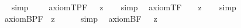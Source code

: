 \begin{isabellebody}
\isadelimproof
\ %
\endisadelimproof
%
\isatagproof
{}\isamarkupfalse%
\ simp%
\endisatagproof
{\isafoldproof}%
%
\isadelimproof
%
\endisadelimproof
\ \isamarkupfalse%
%
\isadelimproof
\ %
\endisadelimproof
%
\isatagproof
{}\isamarkupfalse%
%
\endisatagproof
{\isafoldproof}%
%
\isadelimproof
%
\endisadelimproof
%
\isamarkuptrue%
\isamarkupfalse%
\ axiom{\isacharunderscore}T{\isacharunderscore}PF{\isacharcolon}\ {\isachardoublequoteopen}{\isacharbrackleft}{\isacharparenleft}{\isasymbox}\ {\isacharcomma}{\isasymphi}{\isacharcomma}{\isacharparenright}\ {\isasymrightarrow}\isactrlsup z\ {\isacharcomma}{\isasymphi}{\isacharcomma}{\isacharbrackright}{\isachardoublequoteclose}%
\isadelimproof
\ %
\endisadelimproof
%
\isatagproof
{}\isamarkupfalse%
\ simp\ \isamarkupfalse%
%
\endisatagproof
{\isafoldproof}%
%
\isadelimproof
%
\endisadelimproof
\isanewline
{}\isamarkupfalse%
\ axiom{\isacharunderscore}T{\isacharunderscore}F{\isacharcolon}\ \ {\isachardoublequoteopen}{\isacharbrackleft}{\isacharparenleft}{\isasymbox}\ {\isacharsemicolon}{\isasymphi}{\isacharsemicolon}{\isacharparenright}\ {\isasymrightarrow}\isactrlsup z\ {\isacharsemicolon}{\isasymphi}{\isacharsemicolon}{\isacharbrackright}{\isachardoublequoteclose}%
\isadelimproof
\ %
\endisadelimproof
%
\isatagproof
{}\isamarkupfalse%
\ simp\ \isamarkupfalse%
%
\endisatagproof
{\isafoldproof}%
%
\isadelimproof
%
\endisadelimproof
\isanewline
\isanewline
{}\isamarkupfalse%
\ axiom{\isacharunderscore}B{\isacharunderscore}PF{\isacharcolon}\ {\isachardoublequoteopen}{\isacharbrackleft}{\isacharcomma}{\isasymphi}{\isacharcomma}\ {\isasymrightarrow}\isactrlsup z\ {\isacharparenleft}{\isasymbox}\ {\isacharparenleft}{\isasymdiamond}\ {\isacharcomma}{\isasymphi}{\isacharcomma}{\isacharparenright}{\isacharparenright}{\isacharbrackright}{\isachardoublequoteclose}%
\isadelimproof
\ %
\endisadelimproof
%
\isatagproof
{}\isamarkupfalse%
\ simp\ \isamarkupfalse%
%
\endisatagproof
{\isafoldproof}%
%
\isadelimproof
%
\endisadelimproof
\isanewline
{}\isamarkupfalse%
\ axiom{\isacharunderscore}B{\isacharunderscore}F{\isacharcolon}\ \ {\isachardoublequoteopen}{\isacharbrackleft}{\isacharsemicolon}{\isasymphi}{\isacharsemicolon}\ {\isasymrightarrow}\isactrlsup z\ {\isacharparenleft}{\isasymbox}\ {\isacharparenleft}{\isasymdiamond}\ {\isacharsemicolon}{\isasymphi}{\isacharsemicolon}{\isacharparenright}{\isacharparenright}{\isacharbrackright}{\isachardoublequoteclose}%

\end{isabellebody}
